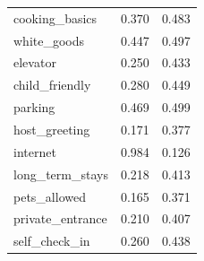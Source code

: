 \begin{table}[H]
{\begin{tabular}{lrr}
cooking\_basics         &     0.370 &        0.483 \\
white\_goods            &     0.447 &        0.497 \\
elevator               &     0.250 &        0.433 \\
child\_friendly         &     0.280 &        0.449 \\
parking                &     0.469 &        0.499 \\
host\_greeting          &     0.171 &        0.377 \\
internet               &     0.984 &        0.126 \\
long\_term\_stays        &     0.218 &        0.413 \\
pets\_allowed           &     0.165 &        0.371 \\
private\_entrance       &     0.210 &        0.407 \\
self\_check\_in          &     0.260 &        0.438 \\
\bottomrule
\end{tabular}
}
\end{table}

